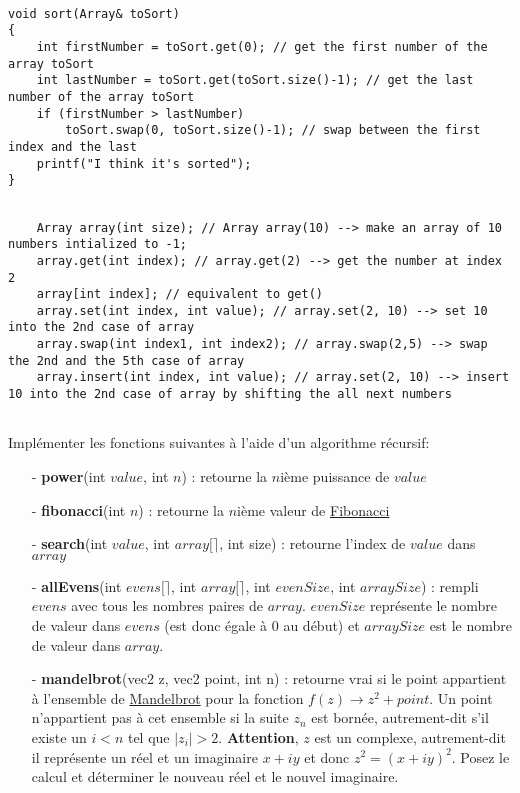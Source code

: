 \documentclass[11pt]{extarticle}
\begin{document}
\begin{center}
\begin{lstlisting}[style=customc, escapechar=@]

void sort(Array& toSort)
{	
	int firstNumber = toSort.get(0); // get the first number of the array toSort
	int lastNumber = toSort.get(toSort.size()-1); // get the last number of the array toSort
	if (firstNumber > lastNumber)
		toSort.swap(0, toSort.size()-1); // swap between the first index and the last
	printf("I think it's sorted");
}

\end{lstlisting}
\begin{lstlisting}[style=customc, escapechar=@]
	
	Array array(int size); // Array array(10) --> make an array of 10 numbers intialized to -1;
	array.get(int index); // array.get(2) --> get the number at index 2
	array[int index]; // equivalent to get()
	array.set(int index, int value); // array.set(2, 10) --> set 10 into the 2nd case of array
	array.swap(int index1, int index2); // array.swap(2,5) --> swap the 2nd and the 5th case of array
	array.insert(int index, int value); // array.set(2, 10) --> insert 10 into the 2nd case of array by shifting the all next numbers	 
	
\end{lstlisting}
\end{center}
\noindent Implémenter les fonctions suivantes à l'aide d'un algorithme récursif:
\begin{itemize}
\item[ - \textbf{power}(int $value$, int $n$)]: retourne la $n$ième puissance de $value$
\item[ - \textbf{fibonacci}(int $n$)]: retourne la $n$ième valeur de \href{https://en.wikipedia.org/wiki/Fibonacci_number}{Fibonacci}
\item[ - \textbf{search}(int $value$, int $array[\rceil$, int size)]: retourne l'index de $value$ dans $array$
\item[ - \textbf{allEvens}(int $evens[\rceil$, int $array[\rceil$, int $evenSize$, int $arraySize$)]: rempli $evens$ avec tous les nombres paires de $array$. $evenSize$ représente le nombre de valeur dans $evens$ (est donc égale à 0 au début) et $arraySize$ est le nombre de valeur dans $array$. 
\item[ - \textbf{mandelbrot}(vec2 z, vec2 point, int n)]: retourne vrai si le point appartient à l'ensemble de \href{https://en.wikipedia.org/wiki/Mandelbrot_set}{Mandelbrot} pour la fonction $f(z) \rightarrow z^2 + point$. Un point n'appartient pas à cet ensemble si la suite $z_n$ est bornée, autrement-dit s'il existe un $i<n$ tel que $|z_i|>2$. \textbf{Attention}, $z$ est un complexe, autrement-dit il représente un réel et un imaginaire $x + iy$ et donc $z^2=(x+iy)^2$. Posez le calcul et déterminer le nouveau réel et le nouvel imaginaire.
\end{itemize}
\end{document}
